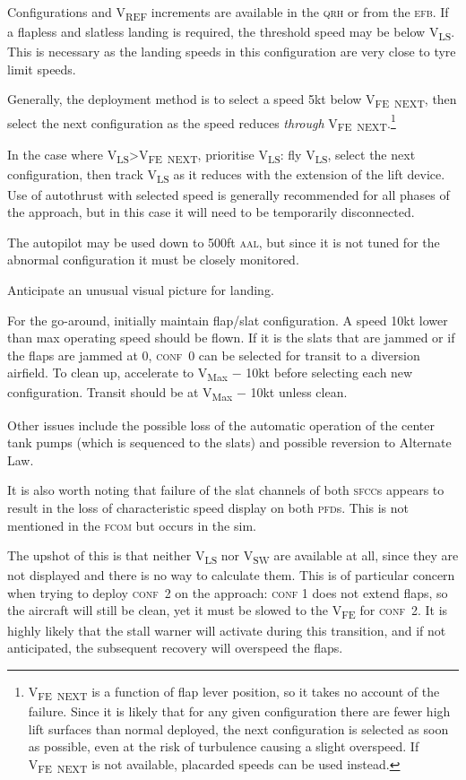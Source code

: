 \documentclass[a5paper,11pt,twoside]{book}
\newcommand{\ac}[1]{{\scshape\MakeLowercase{#1}}}
\newcommand{\V}[1]{V\textsubscript{#1}}
\begin{document}
Configurations and \V{REF} increments are available in the \ac{QRH} or from the
\ac{EFB}. If a flapless and slatless landing is required, the threshold speed
may be below \V{LS}. This is necessary as the landing speeds in this
configuration are very close to tyre limit speeds.

Generally, the deployment method is to select a speed 5kt below \V{FE~NEXT},
then select the next configuration as the speed reduces \emph{through}
\V{FE~NEXT}.\footnote{\V{FE~NEXT} is a function of flap lever position, so it
takes no account of the failure. Since it is likely that for any given
configuration there are fewer high lift surfaces than normal deployed, the next
configuration is selected as soon as possible, even at the risk of turbulence
causing a slight overspeed. If \V{FE~NEXT} is not available, placarded speeds
can be used instead.}

In the case where \V{LS}>\V{FE~NEXT}, prioritise \V{LS}: fly \V{LS}, select the
next configuration, then track \V{LS} as it reduces with the extension of the
lift device. Use of autothrust with selected speed is generally recommended for
all phases of the approach, but in this case it will need to be temporarily
disconnected.

The autopilot may be used down to 500ft \ac{AAL}, but since it is not tuned for
the abnormal configuration it must be closely monitored.

Anticipate an unusual visual picture for landing.

For the go-around, initially maintain flap/slat configuration. A speed 10kt
lower than max operating speed should be flown. If it is the slats that are
jammed or if the flaps are jammed at 0, \ac{conf}~0 can be selected for transit
to a diversion airfield. To clean up, accelerate to \V{Max} $-$ 10kt before
selecting each new configuration. Transit should be at \V{Max} $-$ 10kt unless
clean.

Other issues include the possible loss of the automatic operation of the center
tank pumps (which is sequenced to the slats) and possible reversion to Alternate
Law.

It is also worth noting that failure of the slat channels of both \ac{SFCC}s
appears to result in the loss of characteristic speed display on both
\ac{PFD}s. This is not mentioned in the \ac{FCOM} but occurs in the sim.

The upshot of this is that neither \V{LS} nor \V{SW} are available at all, since
they are not displayed and there is no way to calculate them. This is of
particular concern when trying to deploy \ac{conf}~2 on the approach: \ac{conf}
1 does not extend flaps, so the aircraft will still be clean, yet it must be
slowed to the \V{FE} for \ac{conf}~2. It is highly likely that the stall warner
will activate during this transition, and if not anticipated, the subsequent
recovery will overspeed the flaps.
\end{document}
